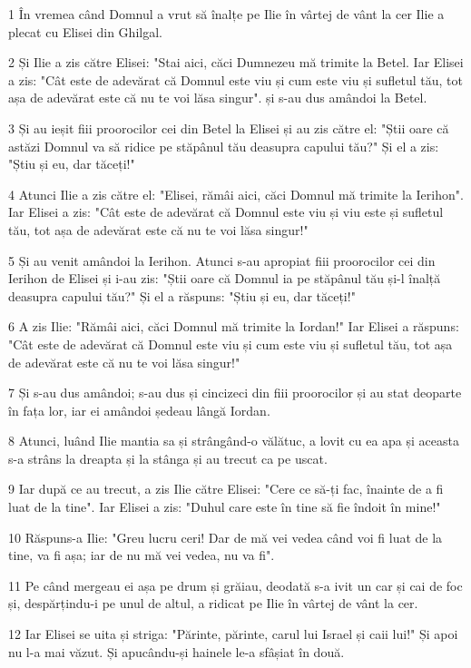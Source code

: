 \par 1 În vremea când Domnul a vrut să înalțe pe Ilie în vârtej de vânt la cer Ilie a plecat cu Elisei din Ghilgal.
\par 2 Și Ilie a zis către Elisei: "Stai aici, căci Dumnezeu mă trimite la Betel. Iar Elisei a zis: "Cât este de adevărat că Domnul este viu și cum este viu și sufletul tău, tot așa de adevărat este că nu te voi lăsa singur". și s-au dus amândoi la Betel.
\par 3 Și au ieșit fiii proorocilor cei din Betel la Elisei și au zis către el: "Știi oare că astăzi Domnul va să ridice pe stăpânul tău deasupra capului tău?" Și el a zis: "Știu și eu, dar tăceți!"
\par 4 Atunci Ilie a zis către el: "Elisei, rămâi aici, căci Domnul mă trimite la Ierihon". Iar Elisei a zis: "Cât este de adevărat că Domnul este viu și viu este și sufletul tău, tot așa de adevărat este că nu te voi lăsa singur!"
\par 5 Și au venit amândoi la Ierihon. Atunci s-au apropiat fiii proorocilor cei din Ierihon de Elisei și i-au zis: "Știi oare că Domnul ia pe stăpânul tău și-l înalță deasupra capului tău?" Și el a răspuns: "Știu și eu, dar tăceți!"
\par 6 A zis Ilie: "Rămâi aici, căci Domnul mă trimite la Iordan!" Iar Elisei a răspuns: "Cât este de adevărat că Domnul este viu și cum este viu și sufletul tău, tot așa de adevărat este că nu te voi lăsa singur!"
\par 7 Și s-au dus amândoi; s-au dus și cincizeci din fiii proorocilor și au stat deoparte în fața lor, iar ei amândoi ședeau lângă Iordan.
\par 8 Atunci, luând Ilie mantia sa și strângând-o vălătuc, a lovit cu ea apa și aceasta s-a strâns la dreapta și la stânga și au trecut ca pe uscat.
\par 9 Iar după ce au trecut, a zis Ilie către Elisei: "Cere ce să-ți fac, înainte de a fi luat de la tine". Iar Elisei a zis: "Duhul care este în tine să fie îndoit în mine!"
\par 10 Răspuns-a Ilie: "Greu lucru ceri! Dar de mă vei vedea când voi fi luat de la tine, va fi așa; iar de nu mă vei vedea, nu va fi".
\par 11 Pe când mergeau ei așa pe drum și grăiau, deodată s-a ivit un car și cai de foc și, despărțindu-i pe unul de altul, a ridicat pe Ilie în vârtej de vânt la cer.
\par 12 Iar Elisei se uita și striga: "Părinte, părinte, carul lui Israel și caii lui!" Și apoi nu l-a mai văzut. Și apucându-și hainele le-a sfâșiat în două.
